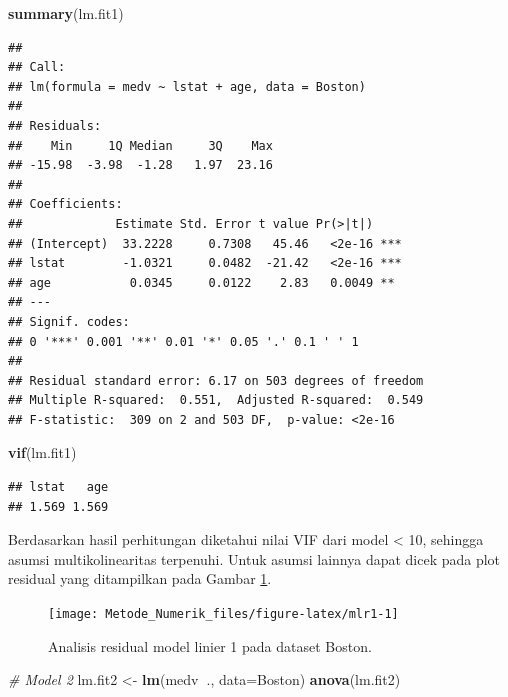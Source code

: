\documentclass[]{book}
\newenvironment{Shaded}{\begin{snugshade}}{\end{snugshade}}
\newcommand{\CommentTok}[1]{\textcolor[rgb]{0.56,0.35,0.01}{\textit{#1}}}
\newcommand{\DataTypeTok}[1]{\textcolor[rgb]{0.13,0.29,0.53}{#1}}
\newcommand{\KeywordTok}[1]{\textcolor[rgb]{0.13,0.29,0.53}{\textbf{#1}}}
\newcommand{\NormalTok}[1]{#1}
\newcommand{\OperatorTok}[1]{\textcolor[rgb]{0.81,0.36,0.00}{\textbf{#1}}}
\newcommand{\StringTok}[1]{\textcolor[rgb]{0.31,0.60,0.02}{#1}}
\theoremstyle{definition}
\theoremstyle{definition}
\theoremstyle{definition}
\theoremstyle{remark}
\begin{document}
\begin{Shaded}
\begin{Highlighting}[]
\KeywordTok{summary}\NormalTok{(lm.fit1)}
\end{Highlighting}
\end{Shaded}

\begin{verbatim}
## 
## Call:
## lm(formula = medv ~ lstat + age, data = Boston)
## 
## Residuals:
##    Min     1Q Median     3Q    Max 
## -15.98  -3.98  -1.28   1.97  23.16 
## 
## Coefficients:
##             Estimate Std. Error t value Pr(>|t|)    
## (Intercept)  33.2228     0.7308   45.46   <2e-16 ***
## lstat        -1.0321     0.0482  -21.42   <2e-16 ***
## age           0.0345     0.0122    2.83   0.0049 ** 
## ---
## Signif. codes:  
## 0 '***' 0.001 '**' 0.01 '*' 0.05 '.' 0.1 ' ' 1
## 
## Residual standard error: 6.17 on 503 degrees of freedom
## Multiple R-squared:  0.551,  Adjusted R-squared:  0.549 
## F-statistic:  309 on 2 and 503 DF,  p-value: <2e-16
\end{verbatim}

\begin{Shaded}
\begin{Highlighting}[]
\KeywordTok{vif}\NormalTok{(lm.fit1)}
\end{Highlighting}
\end{Shaded}

\begin{verbatim}
## lstat   age 
## 1.569 1.569
\end{verbatim}

Berdasarkan hasil perhitungan diketahui nilai VIF dari model \textless{} 10, sehingga asumsi multikolinearitas terpenuhi. Untuk asumsi lainnya dapat dicek pada plot residual yang ditampilkan pada Gambar \ref{fig:mlr1}.

\begin{figure}

{\centering \texttt{[image: Metode\_Numerik\_files/figure-latex/mlr1-1]} 

}

\caption{Analisis residual model linier 1 pada dataset Boston.}\label{fig:mlr1}
\end{figure}

\begin{Shaded}
\begin{Highlighting}[]
\CommentTok{# Model 2}
\NormalTok{lm.fit2 <-}\StringTok{ }\KeywordTok{lm}\NormalTok{(medv}\OperatorTok{~}\NormalTok{., }\DataTypeTok{data=}\NormalTok{Boston)}
\KeywordTok{anova}\NormalTok{(lm.fit2)}
\end{Highlighting}
\end{Shaded}
\end{document}

